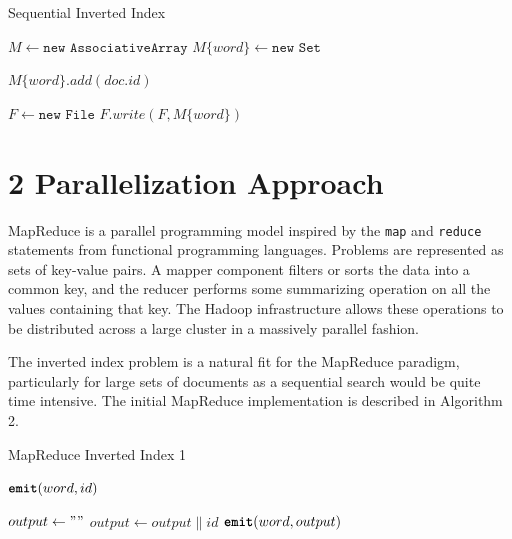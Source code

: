 \documentclass{bsu-ms}
\begin{document}
\begin{algorithm}
\caption{Sequential Inverted Index }
\label{alg:alg1}
\begin{algorithmic}[0]
	\State $M \gets \texttt{new AssociativeArray}$
   		        \State $M\{word\} \gets \texttt{new Set}$
		    \EndIf
		    
		\State $M\{word\}.add(doc.id)$
     	\EndFor
	\EndFor

   \State $F \gets \texttt{new File}$
   		\State $F.write(F, M\{word\})$
    \EndFor
	
\EndFunction
\end{algorithmic}
\end{algorithm}

\section*{2 Parallelization Approach}

MapReduce is a parallel programming model inspired by the \texttt{map} and \texttt{reduce} statements from functional programming languages. Problems are represented as sets of key-value pairs. A mapper component filters or sorts the data into a common key, and the reducer performs some summarizing operation on all the values containing that key. The Hadoop infrastructure allows these operations to be distributed across a large cluster in a massively parallel fashion.

The inverted index problem is a natural fit for the MapReduce paradigm, particularly for large sets of documents as a sequential search would be quite time intensive. The initial MapReduce implementation is described in Algorithm 2.

\begin{algorithm}
	\caption{MapReduce Inverted Index 1}
	\label{alg:alg2}
	\begin{algorithmic}[0]
		\State $\texttt{\textbf{emit}}(word, id)$
		\EndFor
		\EndFunction		

		\State $output \gets ""$
		\State $output \gets output \| id$
		\EndFor
		\State $\texttt{\textbf{emit}}(word, output)$
		\EndFunction		
	\end{algorithmic}
\end{algorithm}
\end{document}

